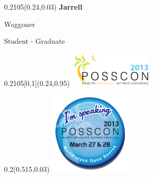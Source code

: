 \documentclass[a4paper]{article}
\begin{document}
\begin{textblock}{0.2105}(0.24,0.03)
  {\fontsize{36}{40} \textbf{Jarrell} } \\
  \begin{Large} Waggoner \end{Large}

  \vspace{2em}

  Student - Graduate
\end{textblock}

\begin{textblock}{0.2105}[0,1](0.24,0.95)
  \includegraphics[width=4cm]{fig/logo}
\end{textblock}



\begin{textblock}{0.2}(0.515,0.03)
  \includegraphics[width=4cm]{fig/speaking}
\end{textblock}


\end{document}
